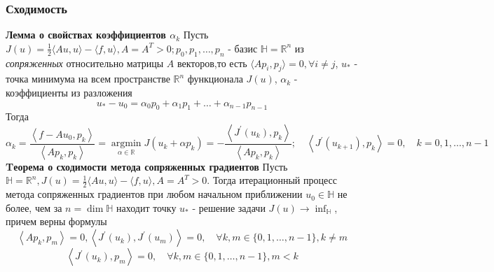 \documentclass[A4]{article}
\begin{document}
\subsubsection{Сходимость}
\textbf{Лемма о свойствах коэффициентов $\alpha_{k}$} Пусть $J(u)=\frac{1}{2}\langle A u, u\rangle-\langle f, u\rangle, A=A^{T}>0 ; p_{0}, p_{1}, \ldots, p_{n} $ -  базис $ \mathbb{H}=\mathbb{R}^{n} $ из \emph{сопряженных} относительно матрицы $ A $ векторов,то есть $\langle Ap_i,p_j\rangle = 0,\forall i\ne j$, $ u_{*} $ - точка минимума на всем пространстве $ \mathbb{R}^{n} $ функционала $ J(u) $, $ \alpha_{k} $ - коэффициенты из разложения
\begin{equation*}
u_{*}-u_{0}=\alpha_{0} p_{0}+\alpha_{1} p_{1}+\ldots+\alpha_{n-1} p_{n-1}
\end{equation*}
Тогда
\begin{equation*}
\alpha_{k}=\frac{\left\langle f-A u_{0}, p_{k}\right\rangle}{\left\langle A p_{k}, p_{k}\right\rangle}=\underset{\alpha \in \mathbb{R}}{\operatorname{argmin}} J\left(u_{k}+\alpha p_{k}\right)=-\frac{\left\langle J^{\prime}\left(u_{k}\right), p_{k}\right\rangle}{\left\langle A p_{k}, p_{k}\right\rangle} ; \quad\left\langle J^{\prime}\left(u_{k+1}\right), p_{k}\right\rangle=0, \quad k=0,1, \ldots, n-1
\end{equation*}
\textbf{Tеорема о сходимости метода сопряженных градиентов} Пусть $ \mathbb{H}=\mathbb{R}^{n}, J(u)=\frac{1}{2}\langle A u, u\rangle-\langle f, u\rangle, A=A^{T}>0$. Тогда итерационный процесс метода сопряженных градиентов при любом начальном приближении $ u_{0} \in \mathbb{H} $ не более, чем за $ n=\operatorname{dim} \mathbb{H} $ находит точку $ u_{*}$ -  решение задачи $ J(u) \rightarrow \inf _{\mathbb{H}}$, причем верны формулы
\begin{equation*}
\left\langle A p_{k}, p_{m}\right\rangle=0,\left\langle J^{\prime}\left(u_{k}\right), J^{\prime}\left(u_{m}\right)\right\rangle=0, \quad \forall k, m \in\{0,1,\ldots,n-1\}, k \neq m
\end{equation*}
\begin{equation*}
\left\langle J^{\prime}\left(u_{k}\right), p_{m}\right\rangle=0, \quad \forall k, m \in\{0,1,\ldots,n-1\}, m<k
\end{equation*}
\end{document}
